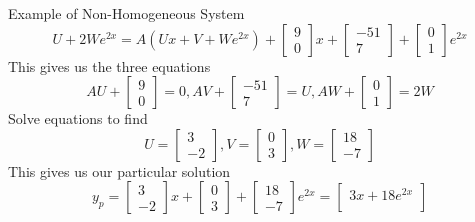 \documentclass{article}
\begin{document}
\begin{multicols*}{3}
\begin{blackbox}{Example of Non-Homogeneous System}
{       {\scriptsize
       \[
        U + 2We^{2x} = A(Ux + V + We^{2x}) + \begin{bmatrix}
            9\\0
        \end{bmatrix}x + \begin{bmatrix}
            -51\\7
        \end{bmatrix} + \begin{bmatrix}
            0\\1
        \end{bmatrix}e^{2x}
        \]
    }
        This gives us the three equations 
        \[AU + \begin{bmatrix}
            9\\0
        \end{bmatrix} = 0, AV + \begin{bmatrix}
            -51\\7
        \end{bmatrix} = U, AW + \begin{bmatrix}
            0\\1
        \end{bmatrix} = 2W\]
        Solve equations to find\\[-2ex]
       \[U = \begin{bmatrix}
        3\\-2
       \end{bmatrix}, V = \begin{bmatrix}
        0\\3
       \end{bmatrix}, W = \begin{bmatrix}
        18\\-7
       \end{bmatrix}\]
        This gives us our particular solution
        \[
            y_p = \begin{bmatrix}
                3\\-2
            \end{bmatrix}x + \begin{bmatrix}
                0\\3
            \end{bmatrix} + \begin{bmatrix}
                18\\-7
            \end{bmatrix}e^{2x} = \begin{bmatrix}
                3x + 18e^{2x}\\

\end{bmatrix}\]}
\end{blackbox}
\end{multicols*}
\end{document}
